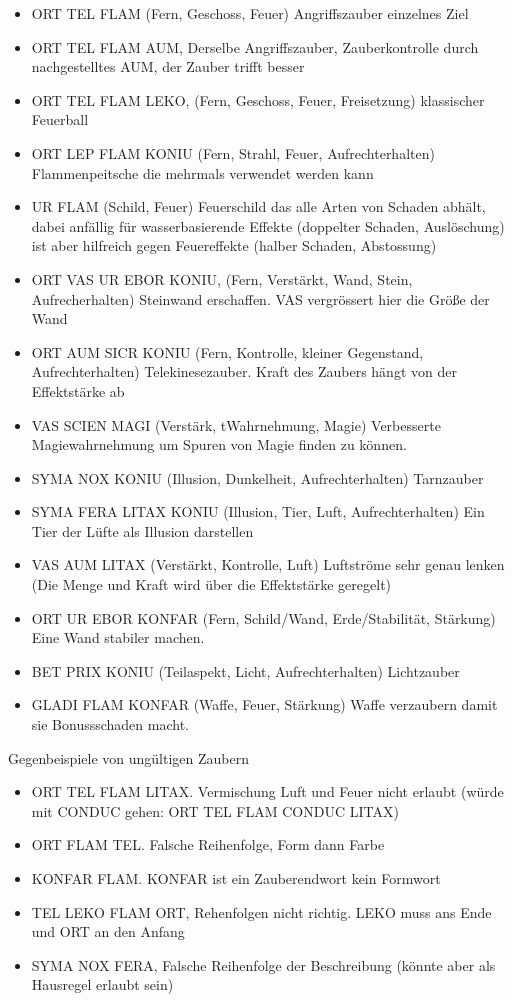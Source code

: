 \documentclass{article}
\begin{document}
\begin{itemize}
\item ORT TEL FLAM (Fern, Geschoss, Feuer) Angriffszauber einzelnes Ziel
\item ORT TEL FLAM AUM, Derselbe Angriffszauber, Zauberkontrolle durch nachgestelltes AUM, der Zauber trifft besser
\item ORT TEL FLAM LEKO, (Fern, Geschoss, Feuer, Freisetzung) klassischer Feuerball
\item ORT LEP FLAM KONIU (Fern, Strahl, Feuer, Aufrechterhalten) Flammenpeitsche die mehrmals verwendet werden kann
\item UR FLAM (Schild, Feuer) Feuerschild das alle Arten von Schaden abhält, dabei anfällig für wasserbasierende Effekte (doppelter Schaden, Auslöschung) ist aber hilfreich gegen Feuereffekte (halber Schaden, Abstossung)
\item ORT VAS UR EBOR KONIU, (Fern, Verstärkt, Wand, Stein, Aufrecherhalten) Steinwand erschaffen. VAS vergrössert hier die Größe der Wand
\item ORT AUM SICR KONIU (Fern, Kontrolle, kleiner Gegenstand, Aufrechterhalten) Telekinesezauber. Kraft des Zaubers hängt von der Effektstärke ab
\item VAS SCIEN MAGI (Verstärk, tWahrnehmung, Magie) Verbesserte Magiewahrnehmung um Spuren von Magie finden zu können.
\item SYMA NOX KONIU (Illusion, Dunkelheit, Aufrechterhalten) Tarnzauber
\item SYMA FERA LITAX KONIU (Illusion, Tier, Luft, Aufrechterhalten) Ein Tier der Lüfte als Illusion darstellen
\item VAS AUM LITAX (Verstärkt, Kontrolle, Luft) Luftströme sehr genau lenken (Die Menge und Kraft wird über die Effektstärke geregelt)
\item ORT UR EBOR KONFAR (Fern, Schild/Wand, Erde/Stabilität, Stärkung) Eine Wand stabiler machen.
\item BET PRIX KONIU (Teilaspekt, Licht, Aufrechterhalten) Lichtzauber
\item GLADI FLAM KONFAR (Waffe, Feuer, Stärkung) Waffe verzaubern damit sie Bonussschaden macht.
\end{itemize}

Gegenbeispiele von ungültigen Zaubern

\begin{itemize}
\item ORT TEL FLAM LITAX. Vermischung Luft und Feuer nicht erlaubt (würde mit CONDUC gehen: ORT TEL FLAM CONDUC LITAX)
\item ORT FLAM TEL. Falsche Reihenfolge, Form dann Farbe
\item KONFAR FLAM. KONFAR ist ein Zauberendwort kein Formwort
\item TEL LEKO FLAM ORT, Rehenfolgen nicht richtig. LEKO muss ans Ende und ORT an den Anfang
\item SYMA NOX FERA, Falsche Reihenfolge der Beschreibung (könnte aber als Hausregel erlaubt sein)
\end{itemize}
\end{document}
